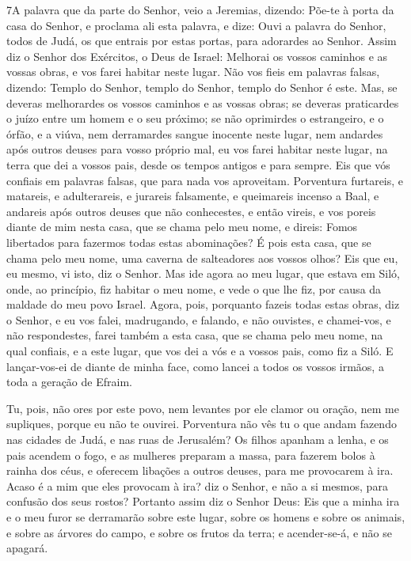 \lettrine{7} A palavra que da parte do Senhor, veio a
Jeremias, dizendo: Põe-te à porta da casa do Senhor, e proclama
ali esta palavra, e dize: Ouvi a palavra do Senhor, todos de Judá,
os que entrais por estas portas, para adorardes ao Senhor. Assim
diz o Senhor dos Exércitos, o Deus de Israel: Melhorai os vossos
caminhos e as vossas obras, e vos farei habitar neste lugar. Não
vos fieis em palavras falsas, dizendo: Templo do Senhor, templo do
Senhor, templo do Senhor é este. Mas, se deveras melhorardes os
vossos caminhos e as vossas obras; se deveras praticardes o juízo
entre um homem e o seu próximo; se não oprimirdes o estrangeiro,
e o órfão, e a viúva, nem derramardes sangue inocente neste lugar,
nem andardes após outros deuses para vosso próprio mal, eu vos
farei habitar neste lugar, na terra que dei a vossos pais, desde os
tempos antigos e para sempre. Eis que vós confiais em palavras
falsas, que para nada vos aproveitam. Porventura furtareis, e
matareis, e adulterareis, e jurareis falsamente, e queimareis
incenso a Baal, e andareis após outros deuses que não conhecestes,
e então vireis, e vos poreis diante de mim nesta casa, que se
chama pelo meu nome, e direis: Fomos libertados para fazermos todas
estas abominações? É pois esta casa, que se chama pelo meu
nome, uma caverna de salteadores aos vossos olhos? Eis que eu, eu
mesmo, vi isto, diz o Senhor. Mas ide agora ao meu lugar, que
estava em Siló, onde, ao princípio, fiz habitar o meu nome, e vede o
que lhe fiz, por causa da maldade do meu povo Israel. Agora,
pois, porquanto fazeis todas estas obras, diz o Senhor, e eu vos
falei, madrugando, e falando, e não ouvistes, e chamei-vos, e não
respondestes, farei também a esta casa, que se chama pelo meu
nome, na qual confiais, e a este lugar, que vos dei a vós e a vossos
pais, como fiz a Siló. E lançar-vos-ei de diante de minha
face, como lancei a todos os vossos irmãos, a toda a geração de
Efraim.

Tu, pois, não ores por este povo, nem levantes por ele clamor ou
oração, nem me supliques, porque eu não te ouvirei.
Porventura não vês tu o que andam fazendo nas cidades de
Judá, e nas ruas de Jerusalém? Os filhos apanham a lenha, e
os pais acendem o fogo, e as mulheres preparam a massa, para fazerem
bolos à rainha dos céus, e oferecem libações a outros deuses, para
me provocarem à ira. Acaso é a mim que eles provocam à ira?
diz o Senhor, e não a si mesmos, para confusão dos seus rostos?
Portanto assim diz o Senhor Deus: Eis que a minha ira e o meu
furor se derramarão sobre este lugar, sobre os homens e sobre os
animais, e sobre as árvores do campo, e sobre os frutos da terra; e
acender-se-á, e não se apagará.

